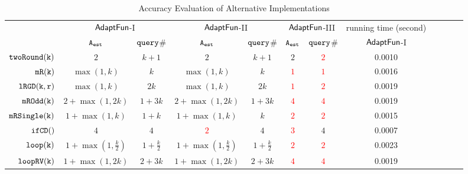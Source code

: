 {\footnotesize
\begin {table}[H]
\vspace{-0.2cm}
    \caption{Accuracy Evaluation of {\THESYSTEM}  Alternative Implementations}
    \vspace{-0.2cm}
        \label{tb:adapt-imp-alternatives}
        \begin{center}
        \centering
{\tiny
        \begin{tabular}{ | >{\tiny}r | c | c | c | c | c | c | c | c | c | c | c |}
        \hline \hline
        \multirow{2}{*}{Program $c$}
         & \multicolumn{2}{c|}{$\textsf{AdaptFun}$-I}
         & \multicolumn{2}{c|}{$\textsf{AdaptFun}$-II}
         & \multicolumn{2}{c|}{$\textsf{AdaptFun}$-III}
         & {running time (second)} \\ 
         \cline{2-8}
         & {${\mathtt{A_{est}}}$ } & {${\tt query}$\# } & {${\mathtt{A_{est}}}$ } & {${\tt query}$\# } & {${\mathtt{A_{est}}}$ } & {${\tt query}$\# } & $\textsf{AdaptFun}$-I \\
         \cline{5-8}
         \hline \hline
         $  \mathtt{twoRound(k)}$ &  $2$    & $k+1 $  & $2$ & $k + 1$ & $2$ & \textcolor{red}{$2$} & 0.0010   \\
         $  \mathtt{mR(k)}$ &   $\max(1,k)$ & $k$  &  $\max(1,k)$ & $k$ & \textcolor{red}{$1$} & \textcolor{red}{$1$} & 0.0016 \\
         $  \mathtt{lRGD(k, r)}$ & $\max(1,k) $ & $ 2k $  &  $\max(1,k) $ & $ 2k $ & \textcolor{red}{$1$} & \textcolor{red}{$2$} & 0.0019   \\
         $  \mathtt{mROdd(k)}$  &  $2+\max(1,2k)  $ & $1 + 3 k $  &  $2+\max(1,2k)  $ & $1 + 3 k $  & \textcolor{red}{$4$} & \textcolor{red}{$4$} & 0.0019 \\
         $  \mathtt{mRSingle(k)}$    & $1+ \max(1, k) $ & $1 + k$  &  $1+ \max(1, k) $ & $k$ & \textcolor{red}{$2$} & \textcolor{red}{$2$} & 0.0015  \\
         $  \mathtt{ifCD()}$   & $4$ &   $4$  & \textcolor{red}{$2$} & $4$ & \textcolor{red}{$3$} & $4$ & 0.0007 \\
         $  \mathtt{loop(k)}$ &    $1 + \max(1, \frac{k}{2}) $  &  $1+\frac{k}{2} $ & $1 + \max(1, \frac{k}{2}) $  &  $1+\frac{k}{2} $ & \textcolor{red}{$2$} & \textcolor{red}{$2$} & 0.0023 \\
         $  \mathtt{loopRV(k)}$   &  $ 1 + \max(1,2k)$ & $2 + 3 k$  &  $ 1 + \max(1,2k)$ & $2 + 3 k$ & \textcolor{red}{$4$} & \textcolor{red}{$4$} & 0.0019 \\

\end{tabular}}
\end{center}
\end{table}}
